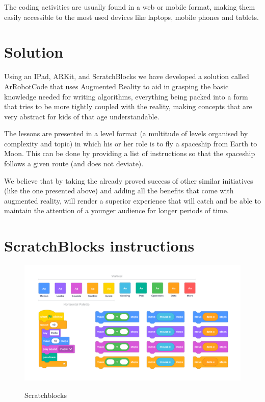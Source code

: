 \documentclass[12 pct]{report}
\begin{document}
The coding  activities are usually found in a web or mobile format, making them easily accessible to the most used devices like laptops, mobile phones and tablets.

\section{Solution}
Using an IPad, ARKit, and ScratchBlocks we have developed a solution called ArRobotCode that uses Augmented Reality to aid in grasping the basic knowledge needed for writing algorithms, everything being packed into a form that tries to be more tightly coupled with the reality, making concepts that are very abstract for kids of that age understandable.

The lessons are presented in a level format (a multitude of levels organised by complexity and topic) in which his or her role is to fly a spaceship from Earth to Moon. This can be done by providing a list of instructions so that the spaceship follows a given route (and does not deviate).

We believe that by taking the already proved success of other similar initiatives (like the one presented above) and adding all the benefits that come with augmented reality, will render a superior experience that will catch and be able to maintain the attention of a younger audience for longer periods of time.

\section{ScratchBlocks instructions}
\begin{figure}[H]
\includegraphics[width=1.0\textwidth]{scratchblocks-2}
\centering
\label{fig:hololens}
\caption{Scratchblocks}
\end{figure}
\end{document}
